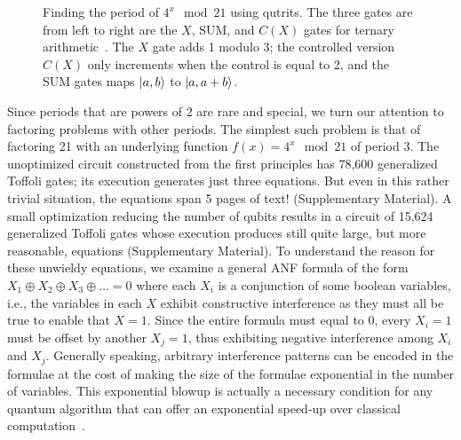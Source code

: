 \documentclass[sigplan]{acmart}
\begin{document}
\begin{wrapfigure}{r}{7cm}
  \centering
\caption{\label{fig:shor21}Finding the period of $4^x \mod{21}$ using
  qutrits. The three gates are from left to right are the $X$,
  $\textrm{SUM}$, and $C(X)$ gates for ternary
  arithmetic~\cite{10.5555/3179473.3179481}. The $X$ gate adds 1
  modulo 3; the controlled version $C(X)$ only increments when the
  control is equal to 2, and the \textrm{SUM} gates maps $\ket{a,b}$
  to $\ket{a,a+b}$.}
\end{wrapfigure}
Since periods that are powers of 2 are rare and special, we turn our
attention to factoring problems with other periods. The simplest such
problem is that of factoring 21 with an underlying function $f(x) =
4^x \mod{21}$ of period 3. The unoptimized circuit constructed from
the first principles has 78,600 generalized Toffoli gates; its
execution generates just three equations. But even in this rather
trivial situation, the equations span 5 pages of text!  (Supplementary
Material). A small optimization reducing the number of qubits results
in a circuit of 15,624 generalized Toffoli gates whose execution
produces still quite large, but more reasonable, equations
(Supplementary Material). To understand the reason for these unwieldy
equations, we examine a general ANF formula of the form $ X_1 \oplus
X_2 \oplus X_3 \oplus \ldots = 0$ where each $X_i$ is a conjunction of
some boolean variables, i.e., the variables in each $X$ exhibit
constructive interference as they must all be true to enable that
$X=1$. Since the entire formula must equal to 0, every $X_i = 1$ must
be offset by another $X_j = 1$, thus exhibiting negative interference
among $X_i$ and $X_j$. Generally speaking, arbitrary interference
patterns can be encoded in the formulae at the cost of making the size
of the formulae exponential in the number of variables. This
exponential blowup is actually a necessary condition for any quantum
algorithm that can offer an exponential speed-up over classical
computation~\cite{10.2307/3560059}.
\end{document}
